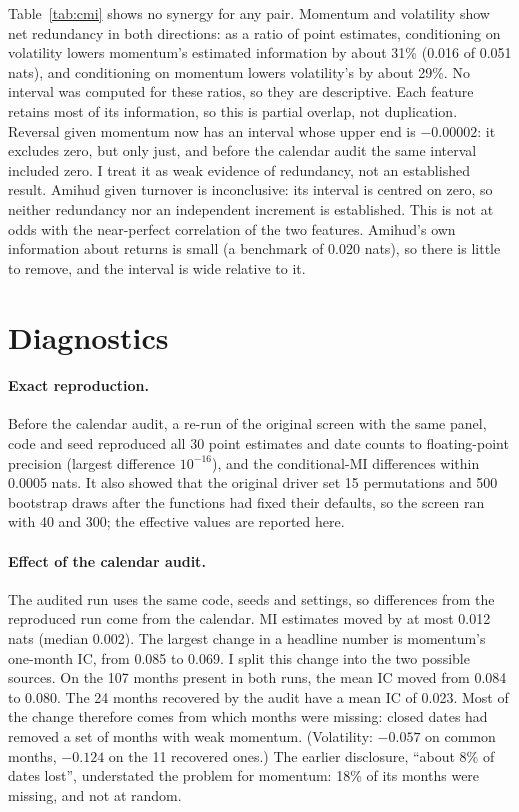 \documentclass[11pt]{article}
\begin{document}
Table~\ref{tab:cmi} shows no synergy for any pair. Momentum and volatility show net
redundancy in both directions: as a ratio of point estimates, conditioning on
volatility lowers momentum's estimated information by about 31\% (0.016 of 0.051
nats), and conditioning on momentum lowers volatility's by about 29\%. No interval was
computed for these ratios, so they are descriptive. Each feature retains most of its
information, so this is partial overlap, not duplication. Reversal given momentum now
has an interval whose upper end is $-0.00002$: it excludes zero, but only just, and
before the calendar audit the same interval included zero. I treat it as weak evidence
of redundancy, not an established result. Amihud given turnover is inconclusive: its
interval is centred on zero, so neither redundancy nor an independent increment is
established. This is not at odds with the near-perfect correlation of the two
features. Amihud's own information about returns is small (a benchmark of 0.020
nats), so there is little to remove, and the interval is wide relative to it.

\section{Diagnostics}
\label{sec:repro}

\paragraph{Exact reproduction.} Before the calendar audit, a re-run of the original
screen with the same panel, code and seed reproduced all 30 point estimates and date
counts to floating-point precision (largest difference $10^{-16}$), and the
conditional-MI differences within 0.0005 nats. It also showed that the original driver
set 15 permutations and 500 bootstrap draws after the functions had fixed their
defaults, so the screen ran with 40 and 300; the effective values are reported here.

\paragraph{Effect of the calendar audit.} The audited run uses the same code, seeds and
settings, so differences from the reproduced run come from the calendar. MI estimates
moved by at most 0.012 nats (median 0.002). The largest change in a headline number
is momentum's one-month IC, from 0.085 to 0.069. I split this change into the two
possible sources. On the 107 months present in both runs, the mean IC moved from 0.084
to 0.080. The 24 months recovered by the audit have a mean IC of 0.023. Most of the
change therefore comes from which months were missing: closed dates had removed a set
of months with weak momentum. (Volatility: $-0.057$ on common months, $-0.124$ on the 11
recovered ones.) The earlier disclosure, ``about 8\% of dates lost'', understated the
problem for momentum: 18\% of its months were missing, and not at random.
\end{document}
